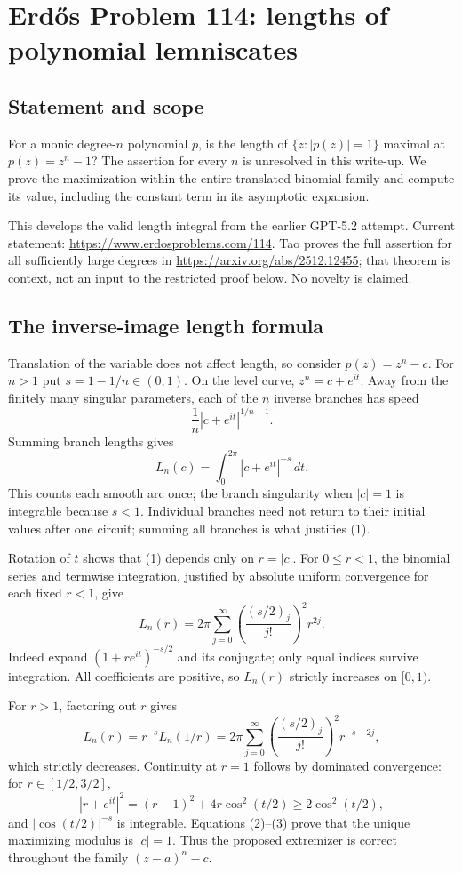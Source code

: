 \section*{Erd\H{o}s Problem 114: lengths of polynomial lemniscates}
\subsection*{Statement and scope}
For a monic degree-$n$ polynomial $p$, is the length of $\{z:|p(z)|=1\}$ maximal at $p(z)=z^n-1$? The assertion for every $n$ is unresolved in this write-up. We prove the maximization within the entire translated binomial family and compute its value, including the constant term in its asymptotic expansion.

This develops the valid length integral from the earlier GPT-5.2 attempt. Current statement: \url{https://www.erdosproblems.com/114}. Tao proves the full assertion for all sufficiently large degrees in \url{https://arxiv.org/abs/2512.12455}; that theorem is context, not an input to the restricted proof below. No novelty is claimed.

\subsection*{The inverse-image length formula}
Translation of the variable does not affect length, so consider $p(z)=z^n-c$. For $n>1$ put $s=1-1/n\in(0,1)$. On the level curve, $z^n=c+e^{it}$. Away from the finitely many singular parameters, each of the $n$ inverse branches has speed
\[
 \frac1n |c+e^{it}|^{1/n-1}.
\]
Summing branch lengths gives
\[
 L_n(c)=\int_0^{2\pi}|c+e^{it}|^{-s}\,dt. \tag{1}
\]
This counts each smooth arc once; the branch singularity when $|c|=1$ is integrable because $s<1$. Individual branches need not return to their initial values after one circuit; summing all branches is what justifies (1).

Rotation of $t$ shows that (1) depends only on $r=|c|$. For $0\le r<1$, the binomial series and termwise integration, justified by absolute uniform convergence for each fixed $r<1$, give
\[
 L_n(r)=2\pi\sum_{j=0}^\infty
 \left(\frac{(s/2)_j}{j!}\right)^2 r^{2j}. \tag{2}
\]
Indeed expand $(1+r e^{it})^{-s/2}$ and its conjugate; only equal indices survive integration. All coefficients are positive, so $L_n(r)$ strictly increases on $[0,1)$.

For $r>1$, factoring out $r$ gives
\[
 L_n(r)=r^{-s}L_n(1/r)
 =2\pi\sum_{j=0}^\infty
 \left(\frac{(s/2)_j}{j!}\right)^2 r^{-s-2j}, \tag{3}
\]
which strictly decreases. Continuity at $r=1$ follows by dominated convergence: for $r\in[1/2,3/2]$,
\[
 |r+e^{it}|^2=(r-1)^2+4r\cos^2(t/2)\ge2\cos^2(t/2),
\]
and $|\cos(t/2)|^{-s}$ is integrable. Equations (2)--(3) prove that the unique maximizing modulus is $|c|=1$. Thus the proposed extremizer is correct throughout the family $(z-a)^n-c$.

